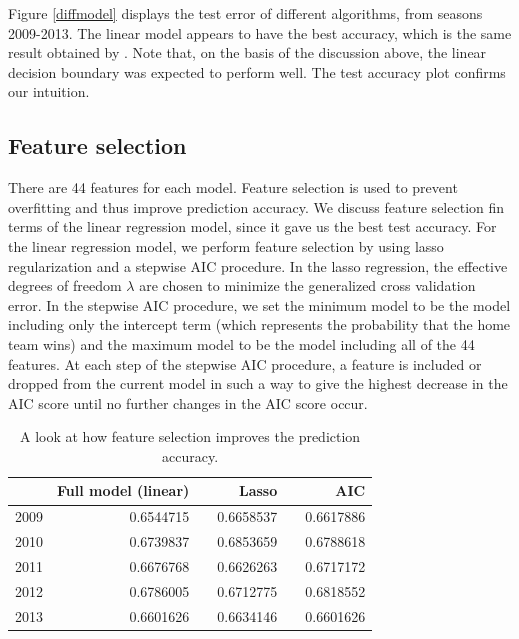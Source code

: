 \documentclass{article} %
\begin{document}
		Figure \ref{diffmodel} displays the test error of different algorithms, from seasons 2009-2013. The linear model appears to have the best accuracy, which is the same result obtained by \cite{nba_oracle}.  Note that, on the basis of the discussion above, the linear decision boundary was expected to perform well. The test accuracy plot confirms our intuition. \\

	
	\subsection{Feature selection}
	There are 44 features for each model. Feature selection is used to prevent overfitting and thus improve prediction accuracy. We discuss feature selection fin terms of the linear regression model, since it gave us the best test accuracy. For the linear regression model, we perform feature selection by using lasso regularization and a stepwise AIC procedure. In the lasso regression, the effective degrees of freedom $\lambda$ are chosen to minimize the generalized cross validation error.  In the stepwise AIC procedure, we set the minimum model to be the model including only the intercept term (which represents the probability that the home team wins) and the maximum model to be the model including all of the 44 features. At each step of the stepwise AIC procedure, a feature is included or dropped from the current model in such a way to give the highest decrease in the AIC score until no further changes in the AIC score occur.  
			\\
			\begin{table}[ht]
	\centering
	\begin{tabular}{rrrrrr}
	  \hline
		 & Full model (linear) & & Lasso & & AIC \\ 
	  \hline
		2009 & 0.6544715 && 0.6658537 && 0.6617886  \\ 
	  	2010 &0.6739837  &&0.6853659 &&0.6788618    \\ 
	  	2011 & 0.6676768 & &  0.6626263 &&  0.6717172  \\ 
	  	2012 &0.6786005& & 0.6712775 && 0.6818552  \\ 
	  	2013 & 0.6601626 && 0.6634146 && 0.6601626  \\ 

	   \hline
	\end{tabular}
	\caption{A look at how feature selection improves the prediction accuracy.}
	\label{table:matrix}
	\label{featsel}
	\end{table}
	\\
\end{document}
